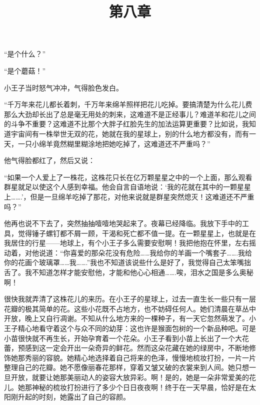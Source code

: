 “是个什么？”

“是个蘑菇！”

小王子当时怒气冲冲，气得脸色发白。

{\startalignment[center]
 \stopalignment}

“千万年来花儿都长着刺，千万年来绵羊照样把花儿吃掉。要搞清楚为什么花儿费那么大劲却长出了总是毫无用处的刺来，这难道不是正经事儿？难道羊和花儿之间的斗争不重要？这难道不比那个大胖子红脸先生的加法运算更重要？比如说，我知道宇宙间有一株举世无双的花，她就在我的星球上，别的什么地方都没有，而有一天，一只小绵羊竟然糊里糊涂地把她吃掉了，这难道还不严重吗？”

他气得脸都红了，然后又说：

“如果一个人爱上了一株花，这株花只长在亿万颗星星之中的一个上面，那么观看群星就足以使这个人感到幸福。他会自言自语地说：‘我的花就在其中的一颗星星上\ldots{}\ldots{}.'，但是一旦绵羊吃掉了那花，对他来说就是群星突然熄灭！这难道还不严重吗？”

他再也说不下去了，突然抽抽噎噎地哭起来了。夜幕已经降临。我放下手中的工具，觉得锤子螺钉都不屑一顾，干渴和死亡都不值一提。在一颗星星上，也就是在我居住的行星------地球上，有个小王子多么需要安慰啊！我把他抱在怀里，左右摇动着，对他说道：“你喜爱的那朵花没有危险\ldots{}\ldots{}我给你的羊画一个嘴套子\ldots{}\ldots{}.我给你的花画个玻璃罩\ldots{}\ldots{}我\ldots{}\ldots{}.”我也不知道该说些什么是好了，我觉得自己太笨嘴拙舌了。我不知道怎样才能安慰他，才能和他心心相通\ldots{}\ldots{}.唉，泪水之国是多么奥秘啊！

\title{第八章}

很快我就弄清了这株花儿的来历。在小王子的星球上，过去一直生长一些只有一层花瓣的极其简单的花。这些小花既不占地方，也不妨碍任何人。她们清晨在草丛中开放，晚上又自行凋谢。不知从什么地方来的一棵种子，有一天它忽然萌发了。小王子精心地看守着这个与众不同的幼芽：这也许是猴面包树的一个新品种吧。可是小苗很快就不再生长，开始孕育着一个花朵。小王子看到小苗上长出了一个大花蕾，预感到这一定会开出一朵奇异的鲜花。然而这朵花藏在她的绿房中，不断地修饰她那秀丽的容貌。她精心地选择着自己将来的色泽，慢慢地梳妆打扮，一片一片整理自己的花瓣。她不愿像丽春花那样，穿着又皱又破的衣裳来到人间。她只想一旦开放，就要让她那美丽动人的姿容大放异彩。啊！是的，她是一朵非常爱美的花儿。她那神秘的梳妆打扮进行了多少个日日夜夜啊！终于在一天早晨，恰好是在太阳刚升起的时刻，她露出了自己的容颜。

{\startalignment[center]
 \stopalignment}

